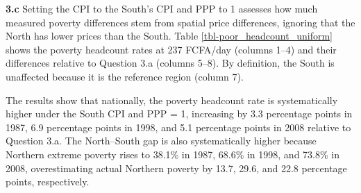 \documentclass[
  letterpaper,
  DIV=11,
  numbers=noendperiod]{scrartcl}
\begin{document}
\textbf{3.c} Setting the CPI to the South's CPI and PPP to 1 assesses
how much measured poverty differences stem from spatial price
differences, ignoring that the North has lower prices than the South.
Table \ref{tbl-poor_headcount_uniform} shows the poverty headcount rates
at 237 FCFA/day (columns 1--4) and their differences relative to
Question 3.a (columns 5--8). By definition, the South is unaffected
because it is the reference region (column 7).

The results show that nationally, the poverty headcount rate is
systematically higher under the South CPI and PPP = 1, increasing by 3.3
percentage points in 1987, 6.9 percentage points in 1998, and 5.1
percentage points in 2008 relative to Question 3.a. The North--South gap
is also systematically higher because Northern extreme poverty rises to
38.1\% in 1987, 68.6\% in 1998, and 73.8\% in 2008, overestimating
actual Northern poverty by 13.7, 29.6, and 22.8 percentage points,
respectively.
\end{document}
